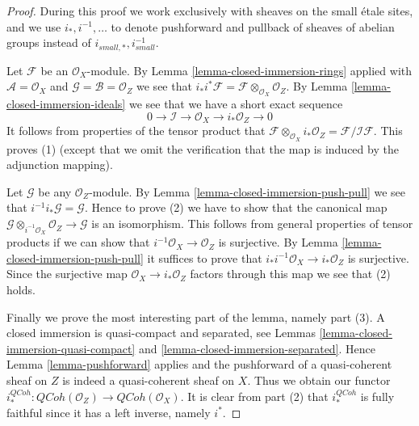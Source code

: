 \documentclass{stacks-project}
\theoremstyle{plain}
\theoremstyle{definition}
\theoremstyle{remark}
\numberwithin{equation}{subsection}
\def\QCoh{\mathit{QCoh}}
\begin{document}
\begin{proof}
During this proof we work exclusively with sheaves on
the small \'etale sites, and we use $i_*, i^{-1}, \ldots$
to denote pushforward and pullback of sheaves of abelian groups
instead of $i_{small, *}, i_{small}^{-1}$.

\medskip\noindent
Let $\mathcal{F}$ be an $\mathcal{O}_X$-module. By
Lemma \ref{lemma-closed-immersion-rings} applied with
$\mathcal{A} = \mathcal{O}_X$ and
$\mathcal{G} = \mathcal{B} = \mathcal{O}_Z$ we see that
$i_*i^*\mathcal{F} = \mathcal{F} \otimes_{\mathcal{O}_X} \mathcal{O}_Z$.
By
Lemma \ref{lemma-closed-immersion-ideals}
we see that we have a short exact sequence
$$
0 \to \mathcal{I} \to \mathcal{O}_X \to i_*\mathcal{O}_Z \to 0
$$
It follows from properties of the tensor product that
$\mathcal{F} \otimes_{\mathcal{O}_X} i_*\mathcal{O}_Z
= \mathcal{F}/\mathcal{I}\mathcal{F}$. This proves (1) (except
that we omit the verification that the map is induced by the
adjunction mapping).

\medskip\noindent
Let $\mathcal{G}$ be any $\mathcal{O}_Z$-module. By
Lemma \ref{lemma-closed-immersion-push-pull}
we see that $i^{-1}i_*\mathcal{G} = \mathcal{G}$.
Hence to prove (2) we have to show that the canonical map
$\mathcal{G} \otimes_{i^{-1}\mathcal{O}_X} \mathcal{O}_Z \to \mathcal{G}$
is an isomorphism. This follows from general properties of tensor products
if we can show that $i^{-1}\mathcal{O}_X \to \mathcal{O}_Z$ is surjective. By
Lemma \ref{lemma-closed-immersion-push-pull}
it suffices to prove that
$i_*i^{-1}\mathcal{O}_X \to i_*\mathcal{O}_Z$
is surjective. Since the surjective map $\mathcal{O}_X \to i_*\mathcal{O}_Z$
factors through this map we see that (2) holds.

\medskip\noindent
Finally we prove the most interesting part of the lemma, namely part (3).
A closed immersion is quasi-compact and separated, see
Lemmas \ref{lemma-closed-immersion-quasi-compact} and
\ref{lemma-closed-immersion-separated}. Hence
Lemma \ref{lemma-pushforward}
applies and the pushforward of a quasi-coherent
sheaf on $Z$ is indeed a quasi-coherent sheaf on $X$.
Thus we obtain our functor
$i^{QCoh}_* : \QCoh(\mathcal{O}_Z)
\to \QCoh(\mathcal{O}_X)$.
It is clear from part (2) that $i^{QCoh}_*$ is fully faithful since
it has a left inverse, namely $i^*$.


\end{proof}
\end{document}
